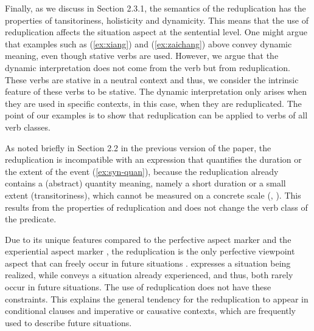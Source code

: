 \documentclass[fleqn,twoside]{article}
\begin{document}
\begin{enumerate}
Finally, as we discuss in Section 2.3.1, the semantics of the reduplication has the properties of tansitoriness, holisticity and dynamicity.
This means that the use of reduplication affects the situation aspect at the sentential level.
One might argue that examples such as (\ref{ex:xiang}) and (\ref{ex:zaichang}) above convey dynamic meaning, even though stative verbs are used.
However, we argue that the dynamic interpretation does not come from the verb but from reduplication.
These verbs are stative in a neutral context and thus, we consider the intrinsic feature of these verbs to be stative.
The dynamic interpretation only arises when they are used in specific contexts, in this case, when they are reduplicated.
The point of our examples is to show that reduplication can be applied to verbs of all verb classes.

As noted briefly in Section 2.2 in the previous version of the paper,
the reduplication is incompatible with an expression that quantifies the duration or the extent of the event (\ref{ex:syn-quan}),
 because the reduplication already contains a (abstract) quantity meaning, namely a short duration or a small extent (transitoriness),
 which cannot be measured on a concrete scale (\citealt[155]{XiaoMcEnery2004}, \citealt[333]{SuiHu2016}).
 \ea %
 \label{ex:syn-quan}
 \z
 \z
 This results from the properties of reduplication and does not change the verb class of the predicate.

Due to its unique features compared to the perfective aspect marker  and the experiential aspect marker ,
the reduplication is the only perfective viewpoint aspect that can freely occur in future situations \citep[156--157]{XiaoMcEnery2004}.
 expresses a situation being realized,
while  conveys a situation already experienced,
and thus, both rarely occur in future situations.
The use of reduplication does not have these constraints.
This explains the general tendency for the reduplication to appear in conditional clauses and imperative or causative contexts,
which are frequently used to describe future situations.


\end{enumerate}
\end{document}
